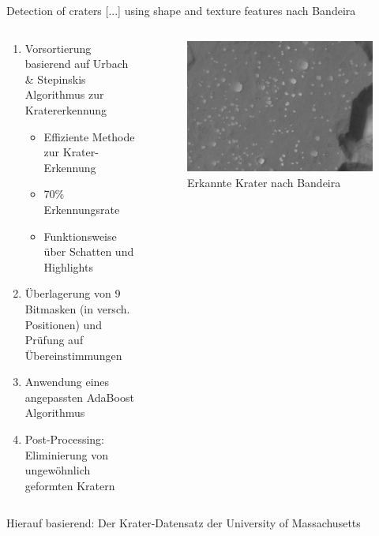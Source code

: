 \documentclass[9pt]{beamer}
\begin{document}
\begin{frame}{Detection of craters [...] using shape and texture features nach Bandeira\cite{Bandeira2012}}
\begin{columns}
	\begin{column}{.5\textwidth}
		\begin{enumerate}
		\item Vorsortierung basierend auf Urbach \& Stepinskis Algorithmus\cite{urbach2009automatic} zur Kratererkennung
		\begin{itemize}
			\item Effiziente Methode zur Krater-Erkennung
			\item 70\% Erkennungsrate
			\item Funktionsweise über Schatten und Highlights
		\end{itemize}
		\item Überlagerung von 9 Bitmasken (in versch. Positionen) und Prüfung auf Übereinstimmungen
		\item Anwendung eines angepassten AdaBoost Algorithmus
		\item Post-Processing: Eliminierung von ungewöhnlich geformten Kratern
		\end{enumerate}
	\end{column}
	\begin{column}{.5\textwidth}
		\begin{figure}[H]
			\includegraphics[width=\textwidth, keepaspectratio]{bandeira_detected.png}
			\caption{Erkannte Krater nach Bandeira\cite{Bandeira2012}}
		\end{figure}
	\end{column}
\end{columns}
\bigskip
Hierauf basierend: Der Krater-Datensatz der University of Massachusetts\cite{umass_craters}
\end{frame}
\end{document}
